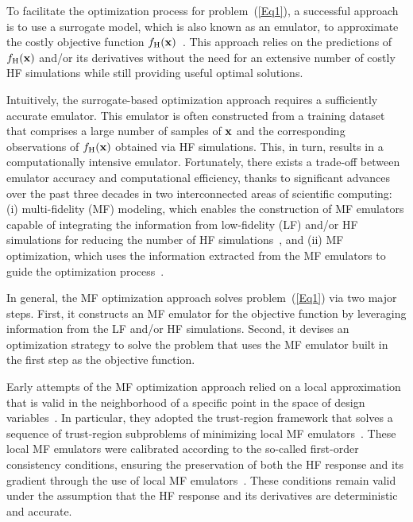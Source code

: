 \documentclass[iicol,sn-basic]{sn-jnl}%
\theoremstyle{thmstyleone}%
\theoremstyle{thmstyletwo}
\theoremstyle{thmstylethree}
\begin{document}
\begin{linenumbers}
To facilitate the optimization process for problem~(\ref{Eq1}), a successful approach is to use a surrogate model, which is also known as an emulator, to approximate the costly objective function $f_\text{H}(\bf x)$~\citep{Queipo2005,Wang2006,Forrester2008,Simpson2008,Forrester2009}.
This approach relies on the predictions of $f_\text{H}(\bf x)$ and/or its derivatives without the need for an extensive number of costly HF simulations while still providing useful optimal solutions.

Intuitively, the surrogate-based optimization approach requires a sufficiently accurate emulator.
This emulator is often constructed from a training dataset that comprises a large number of samples of $\bf x$ and the corresponding observations of $f_\text{H}(\bf x)$ obtained via HF simulations.
This, in turn, results in a computationally intensive emulator.
Fortunately, there exists a trade-off between emulator accuracy and computational efficiency, thanks to significant advances over the past three decades in two interconnected areas of scientific computing: (i) multi-fidelity (MF) modeling, which enables the construction of MF emulators capable of integrating the information from low-fidelity (LF) and/or HF simulations for reducing the number of HF simulations~\citep{Godino2016,Peherstorfer2018}, and (ii) MF optimization, which uses the information extracted from the MF emulators to guide the optimization process~\citep{Alexandrov1998,Forrester2007,Viana2014}.

In general, the MF optimization approach solves problem~(\ref{Eq1}) via two major steps.
First, it constructs an MF emulator for the objective function by leveraging information from the LF and/or HF simulations.
Second, it devises an optimization strategy to solve the problem that uses the MF emulator built in the first step as the objective function.

Early attempts of the MF optimization approach relied on a local approximation that is valid in the neighborhood of a specific point in the space of design variables~\citep{Barthelemy1993,Peherstorfer2018}.
In particular, they adopted the trust-region framework that solves a sequence of trust-region subproblems of minimizing local MF emulators~\citep{Alexandrov1998,Alexandrov2001,Gano2005,Robinson2008,March2012a}.
These local MF emulators were calibrated according to the so-called first-order consistency conditions, ensuring the preservation of both the HF response and its gradient through the use of local MF emulators~\citep{Alexandrov1998}.
These conditions remain valid under the assumption that the HF response and its derivatives are deterministic and accurate.


\end{linenumbers}
\end{document}
